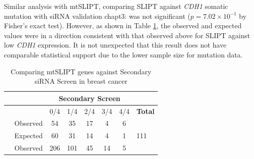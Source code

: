 Similar analysis with mtSLIPT, comparing SLIPT against \textit{CDH1} somatic mutation with siRNA validation chapt3: was not significant ($p=7.02 \times 10^{-1}$ by Fisher's exact test). However,  as shown in Table \ref{tab:secondary_screen_mtSL}, the observed and expected values were in a direction consistent with that observed above for SLIPT against low \textit{CDH1} expression. It is not unexpected that this result does not have comparable statistical support due to the lower sample size for mutation data. 

\begin{table}[!ht]
\caption{Comparing mtSLIPT genes against Secondary siRNA Screen in breast cancer}
\label{tab:secondary_screen_mtSL}
\begin{center}
\begin{tabular}{>{\cellcolor{white}}rrcccccl}
                                                                              &                                                           & \multicolumn{5}{c}{\bfseries Secondary Screen}                                                                                     &                                           \\ \cline{3-7}
\rowcolor{black!10}
                                                                              & \multicolumn{1}{r|}{\cellcolor{white}}                    & 0/4                      & 1/4                      & 2/4                     & 3/4                     & \multicolumn{1}{c|}{4/4} & \cellcolor{white} \textbf{Total}          \\ \cline{2-8} 
\rowcolor{black!5}
\multicolumn{1}{r|}{\cellcolor{white}}                                        & \multicolumn{1}{r|}{Observed}                             & 54                       & 35                       & 17                      & 4                       & \multicolumn{1}{c|}{6}   &  \multicolumn{1}{l|}{}                     \\
\rowcolor{black!10}
\multicolumn{1}{r|}{\cellcolor{white} \multirow{-2}{*}{\bfseries mtSLIPT$+$}} & \multicolumn{1}{r|}{Expected}                             & 60                       & 31                       & 14                      & 4                       & \multicolumn{1}{c|}{1}   & \multicolumn{1}{l|}{\multirow{-2}{*}{111}}    \\ \cline{2-8} 
\rowcolor{black!5}
\multicolumn{1}{r|}{\cellcolor{white}}                                        & \multicolumn{1}{r|}{Observed}                             & 206                      & 101                      & 45                      & 14                      & \multicolumn{1}{c|}{5}   & \multicolumn{1}{l|}{}                     \\

\end{tabular}
\end{center}
\end{table}
